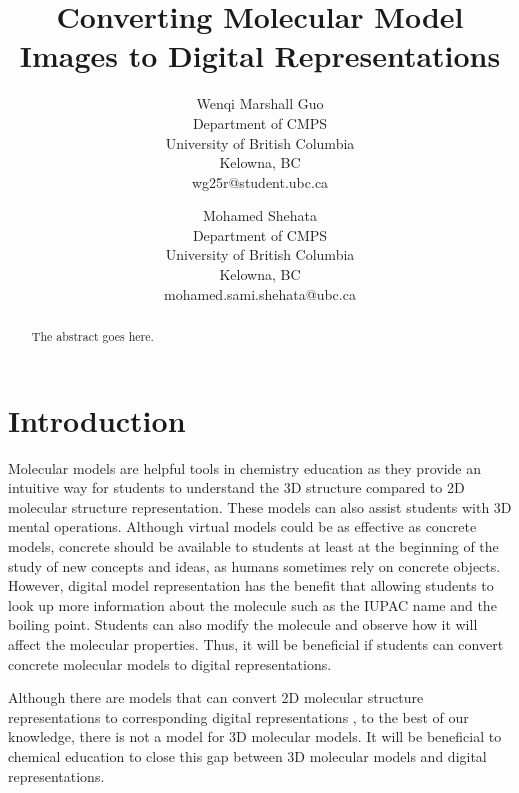 \documentclass{article}
\begin{document}
\title{Converting Molecular Model Images to Digital Representations}


\author{Wenqi Marshall Guo\\
Department of CMPS\\
University of British Columbia\\
Kelowna, BC\\
wg25r@student.ubc.ca 
\and
Mohamed Shehata\\
Department of CMPS\\
University of British Columbia\\
Kelowna, BC\\
mohamed.sami.shehata@ubc.ca
}

\maketitle


\begin{abstract}
The abstract goes here.
\end{abstract}


\section{Introduction}
Molecular models are helpful tools in chemistry education as they provide an intuitive way for students to understand the 3D structure compared to 2D molecular structure representation. These models can also assist students with 3D mental operations. Although virtual models could be as effective as concrete models, concrete should be available to students at least at the beginning of the study of new concepts and ideas, as humans sometimes rely on concrete objects.\autocite{savec_evaluating_2005} However, digital model representation has the benefit that allowing students to look up more information about the molecule such as the IUPAC name and the boiling point. Students can also modify the molecule and observe how it will affect the molecular properties. Thus, it will be beneficial if students can convert concrete molecular models to digital representations. 

Although there are models that can convert 2D molecular structure representations to corresponding digital representations \autocite{swinocsr}\autocite{decimer}\autocite{chempix}, to the best of our knowledge, there is not a model for 3D molecular models. It will be beneficial to chemical education to close this gap between 3D molecular models and digital representations. 
\end{document}
